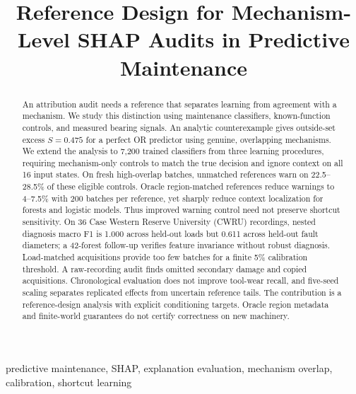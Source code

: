 \documentclass[conference]{IEEEtran}
\begin{document}
\title{Reference Design for Mechanism-Level SHAP Audits in Predictive Maintenance}
\author{
}

\maketitle
\begin{abstract}
An attribution audit needs a reference that separates learning from agreement with a mechanism. We study this distinction using maintenance classifiers, known-function controls, and measured bearing signals. An analytic counterexample gives outside-set excess $S=0.475$ for a perfect OR predictor using genuine, overlapping mechanisms. We extend the analysis to 7,200 trained classifiers from three learning procedures, requiring mechanism-only controls to match the true decision and ignore context on all 16 input states. On fresh high-overlap batches, unmatched references warn on 22.5--28.5\% of these eligible controls. Oracle region-matched references reduce warnings to 4--7.5\% with 200 batches per reference, yet sharply reduce context localization for forests and logistic models. Thus improved warning control need not preserve shortcut sensitivity. On 36 Case Western Reserve University (CWRU) recordings, nested diagnosis macro F1 is 1.000 across held-out loads but 0.611 across held-out fault diameters; a 42-forest follow-up verifies feature invariance without robust diagnosis. Load-matched acquisitions provide too few batches for a finite 5\% calibration threshold. A raw-recording audit finds omitted secondary damage and copied acquisitions. Chronological evaluation does not improve tool-wear recall, and five-seed scaling separates replicated effects from uncertain reference tails. The contribution is a reference-design analysis with explicit conditioning targets. Oracle region metadata and finite-world guarantees do not certify correctness on new machinery.
\end{abstract}
\begin{IEEEkeywords}
predictive maintenance, SHAP, explanation evaluation, mechanism overlap, calibration, shortcut learning
\end{IEEEkeywords}
\end{document}
